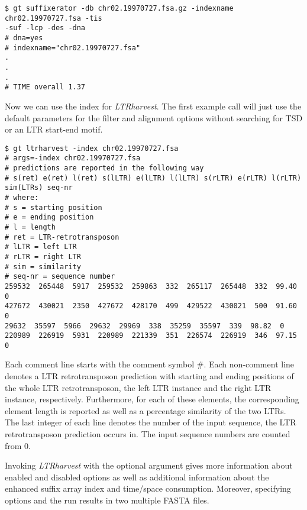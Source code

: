 \documentclass[12pt,titlepage]{article}
\newcommand{\LTRharvest}{\textit{LTRharvest}\xspace}
\begin{document}
\begin{footnotesize}
\begin{verbatim}
$ gt suffixerator -db chr02.19970727.fsa.gz -indexname chr02.19970727.fsa -tis 
-suf -lcp -des -dna
# dna=yes
# indexname="chr02.19970727.fsa"
.
.
.
# TIME overall 1.37
\end{verbatim}
\end{footnotesize}

Now we can use the index for \LTRharvest. The first example call will just use
the default parameters for the filter and alignment options 
without searching for TSD or an LTR start-end motif.

\begin{footnotesize}
\begin{verbatim}
$ gt ltrharvest -index chr02.19970727.fsa
# args=-index chr02.19970727.fsa
# predictions are reported in the following way
# s(ret) e(ret) l(ret) s(lLTR) e(lLTR) l(lLTR) s(rLTR) e(rLTR) l(rLTR) 
sim(LTRs) seq-nr
# where:
# s = starting position
# e = ending position
# l = length
# ret = LTR-retrotransposon
# lLTR = left LTR
# rLTR = right LTR
# sim = similarity
# seq-nr = sequence number
259532  265448  5917  259532  259863  332  265117  265448  332  99.40  0
427672  430021  2350  427672  428170  499  429522  430021  500  91.60  0
29632  35597  5966  29632  29969  338  35259  35597  339  98.82  0
220989  226919  5931  220989  221339  351  226574  226919  346  97.15  0
\end{verbatim}
\end{footnotesize}

Each comment line starts with the comment symbol \#.
Each non-comment line denotes a LTR retrotransposon prediction with
starting and ending positions of the whole LTR retrotransposon, the
left LTR instance and the right LTR instance, respectively. Furthermore,
for each of these elements, the corresponding element length is reported
as well as a percentage similarity of the two LTRs. The last integer of
each line denotes the number of the input sequence, the LTR retrotransposon
prediction occurs in. The input sequence numbers are counted from 0.

Invoking \LTRharvest with the optional argument  gives
more information about enabled and disabled options as well as 
additional information about the enhanced suffix array index
and time/space consumption. Moreover, specifying options  
and  the run results in two multiple FASTA files.
\end{document}
